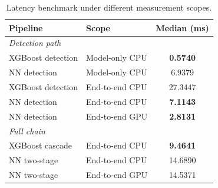 \begin{table}[t]
\caption{Latency benchmark under different measurement scopes.}
\label{tab:latency}
\centering
\begin{tabular}{p{}p{}c}
\toprule
Pipeline & Scope & Median (ms) \\
\midrule
\multicolumn{3}{l}{\textit{Detection path}} \\
XGBoost detection & Model-only CPU & \textbf{0.5740} \\
NN detection & Model-only CPU & 6.9379 \\
XGBoost detection & End-to-end CPU & 27.3447 \\
NN detection & End-to-end CPU & \textbf{7.1143} \\
NN detection & End-to-end GPU & \textbf{2.8131} \\
\midrule
\multicolumn{3}{l}{\textit{Full chain}} \\
XGBoost cascade & End-to-end CPU & \textbf{9.4641} \\
NN two-stage & End-to-end CPU & 14.6890 \\
NN two-stage & End-to-end GPU & 14.5371 \\
\bottomrule
\end{tabular}
\end{table}
